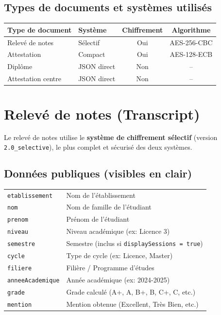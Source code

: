 \documentclass[a4paper,11pt]{article}
\begin{document}
\subsection{Types de documents et syst\`emes utilis\'es}

\begin{center}
\begin{tabular}{llcc}
\toprule
\textbf{Type de document} & \textbf{Syst\`eme} & \textbf{Chiffrement} & \textbf{Algorithme} \\
\midrule
Relev\'e de notes & S\'electif & Oui & AES-256-CBC \\
Attestation & Compact & Oui & AES-128-ECB \\
Dipl\^ome & JSON direct & Non & -- \\
Attestation centre & JSON direct & Non & -- \\
\bottomrule
\end{tabular}
\end{center}

\section{Relev\'e de notes (Transcript)}

Le relev\'e de notes utilise le \textbf{syst\`eme de chiffrement s\'electif} (version \texttt{2.0\_selective}), le plus complet et s\'ecuris\'e des deux syst\`emes.

\subsection{Donn\'ees publiques (visibles en clair)}

\begin{tcolorbox}[colback=green!5, colframe=publicgreen, title={\textcolor{publicgreen}{\textbf{Champs visibles lors du scan}}}]
\begin{longtable}{p{4.5cm}p{8cm}}
\texttt{etablissement} & Nom de l'\'etablissement \\
\texttt{nom} & Nom de famille de l'\'etudiant \\
\texttt{prenom} & Pr\'enom de l'\'etudiant \\
\texttt{niveau} & Niveau acad\'emique (ex: Licence 3) \\
\texttt{semestre} & Semestre (inclus si \texttt{displaySessions = true}) \\
\texttt{cycle} & Type de cycle (ex: Licence, Master) \\
\texttt{filiere} & Fili\`ere / Programme d'\'etudes \\
\texttt{anneeAcademique} & Ann\'ee acad\'emique (ex: 2024-2025) \\
\texttt{grade} & Grade calcul\'e (A+, A, B+, B, C+, C, etc.) \\
\texttt{mention} & Mention obtenue (Excellent, Tr\`es Bien, etc.) \\
\end{longtable}
\end{tcolorbox}
\end{document}
